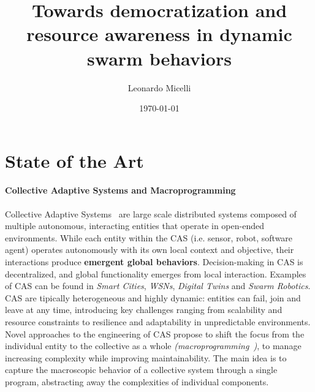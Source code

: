 \documentclass[12pt]{article}
\begin{document}
\title{Towards democratization and resource awareness in dynamic swarm behaviors}
\author{Leonardo Micelli}
\date{\today}
\maketitle

\noindent


\newpage
\setcounter{tocdepth}{2}

\setlength{\parindent}{0em}
\setlength{\parskip}{1em}

\section{State of the Art}
\paragraph{\textbf{Collective Adaptive Systems and Macroprogramming}} Collective Adaptive Systems~\cite{ferscha2015collective} are large scale distributed systems composed of multiple autonomous, 
interacting entities that operate in open-ended environments. While each entity within the CAS (i.e. sensor, robot, software agent) operates autonomously with its own local context and objective, their interactions
produce \textbf{emergent global behaviors}. Decision-making in CAS is decentralized, and global functionality emerges from local interaction. Examples of CAS can be found in \textit{Smart Cities}, \textit{WSNs}, \textit{Digital Twins} and \textit{Swarm Robotics}.
CAS are tipically heterogeneous and highly dynamic: entities can fail, join and leave at any time, introducing key challenges ranging from scalability and resource constraints to resilience and adaptability in
unpredictable environments. Novel approaches to the engineering of CAS propose to shift the focus from the individual entity to the collective as a whole \textit{(macroprogramming~\cite{10.1145/3579353})}, to manage increasing complexity while
improving maintainability. The main idea is to capture the macroscopic behavior of a collective system through a single program, abstracting away the complexities of individual components.
\end{document}
